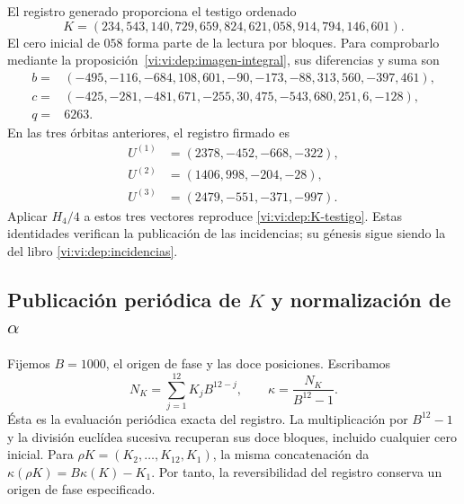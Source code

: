 El registro generado proporciona el testigo ordenado
\begin{equation}
 K=(234,543,140,729,659,824,621,058,914,794,146,601).
 \label{vi:vi:dep:K-testigo}
\end{equation}
El cero inicial de \(058\) forma parte de la lectura por bloques.
Para comprobarlo mediante la proposición~\ref{vi:vi:dep:imagen-integral}, sus diferencias
y suma son
\[
\begin{split}
b={}&(-495,-116,-684,108,601,-90,-173,-88,313,560,-397,461),\\
c={}&(-425,-281,-481,671,-255,30,475,-543,680,251,6,-128),\\
q={}&6263.
\end{split}
\]
En las tres órbitas anteriores, el registro firmado es
\[
 \begin{aligned}
 U^{(1)}&=(2378,-452,-668,-322),\\
 U^{(2)}&=(1406,998,-204,-28),\\
 U^{(3)}&=(2479,-551,-371,-997).
 \end{aligned}
\]
Aplicar \(H_4/4\) a estos tres vectores reproduce
\eqref{vi:vi:dep:K-testigo}. Estas identidades verifican la publicación de
las incidencias; su génesis sigue siendo la del libro
\eqref{vi:vi:dep:incidencias}.

\subsection{\texorpdfstring{Publicación periódica de \(K\) y normalización de \(\alpha\)}{Publicación periódica de K y normalización de alfa}}
\label{vi:vi:dep:alpha}

Fijemos \(B=1000\), el origen de fase y las doce posiciones. Escribamos
\[
 N_K=\sum_{j=1}^{12}K_jB^{12-j},\qquad
 \kappa=\frac{N_K}{B^{12}-1}.
\]
Ésta es la evaluación periódica exacta del registro. La multiplicación
por \(B^{12}-1\) y la división euclídea sucesiva recuperan sus doce
bloques, incluido cualquier cero inicial. Para
\(\rho K=(K_2,\ldots,K_{12},K_1)\), la misma concatenación da
\(\kappa(\rho K)=B\kappa(K)-K_1\). Por tanto, la reversibilidad
del registro conserva un origen de fase especificado.


